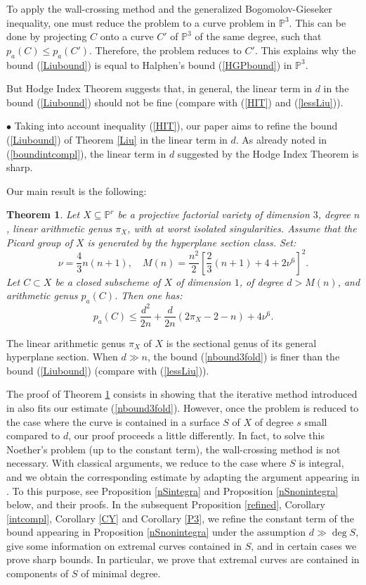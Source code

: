 \documentclass[9pt,a4paper]{amsart}
\theoremstyle{plain}
\newtheorem{theorem}{Theorem}[section]
\theoremstyle{definition}
\theoremstyle{remark}
\begin{document}
\smallskip
To apply the wall-crossing method and the generalized
Bogomolov-Gieseker inequality, one must reduce the problem to a
curve problem in $\mathbb P^3$. This can be done by projecting
$C$ onto a curve $C'$ of $\mathbb P^3$ of the same degree, such
that $p_a(C)\leq p_a(C')$. Therefore, the problem reduces to
$C'$. This explains why the bound
(\ref{Liubound}) is equal to Halphen's bound (\ref{HGPbound}) in $\mathbb P^3$.

\smallskip
But Hodge Index Theorem suggests that, in general,  the linear term
in $d$ in the bound (\ref{Liubound}) should not be fine (compare
with (\ref{HIT}) and (\ref{lessLiu})).

\smallskip
$\bullet$
Taking into account inequality (\ref{HIT}),
our paper aims to refine
the bound (\ref{Liubound}) of Theorem \ref{Liu} in the linear term in $d$.
As already noted in (\ref{boundintcompl}), the linear term in $d$ suggested by the
Hodge Index Theorem is sharp.

\smallskip
Our main result is the following:
\begin{theorem}\label{n3fold}
Let $X\subseteq\mathbb P^r$ be a projective factorial  variety of
dimension $3$, degree $n$, linear arithmetic genus $\pi_X$, with at
worst isolated singularities. Assume that the Picard group of $X$ is
generated by the hyperplane section class.  Set:
$$\nu=\frac{4}{3}n(n+1), \quad M(n)=\frac{n^2}{2}\left[\frac{2}{3}(n+1)+4+2\nu^6\right]^2.$$
Let $C\subset X$ be a closed subscheme of $X$ of dimension $1$, of degree $d>M(n)$, and arithmetic genus
$p_a(C)$. Then one has:
\begin{equation}\label{nbound3fold}
p_a(C)\leq \frac{d^2}{2n}+\frac{d}{2n}(2\pi_X-2-n)+4\nu^6.
\end{equation}
\end{theorem}
The linear arithmetic genus $\pi_X$ of $X$ is the sectional genus
of its general hyperplane section. When $d\gg n$, the bound (\ref{nbound3fold}) is finer than the bound
(\ref{Liubound}) (compare with (\ref{lessLiu})).

\smallskip
The proof of Theorem \ref{n3fold} consists in showing that the
iterative method introduced in \cite[Proof of Theorem 4.9]{Liu} also
fits our estimate (\ref{nbound3fold}). However, once the problem is
reduced to the case where the curve is contained in a surface $S$ of
$X$ of degree $s$ small compared to $d$, our proof proceeds a little
differently. In fact, to solve this Noether's problem (up to the
constant term), the wall-crossing method is not necessary. With
classical arguments, we reduce to the case where $S$ is integral,
and we obtain the corresponding estimate by adapting the argument appearing
in \cite[Proof of Lemma]{D3}. To this purpose, see Proposition \ref{nSintegra}
and Proposition \ref{nSnonintegra} below, and their proofs. In the
subsequent Proposition \ref{refined}, Corollary \ref{intcompl},
Corollary \ref{CY} and Corollary \ref{P3}, we refine the constant
term of the bound appearing in Proposition \ref{nSnonintegra} under
the assumption $d\gg \deg S$, give some information on extremal
curves contained in $S$, and in certain cases we prove sharp bounds.
In particular, we prove that extremal curves are contained in
components of $S$ of minimal degree.
\end{document}
